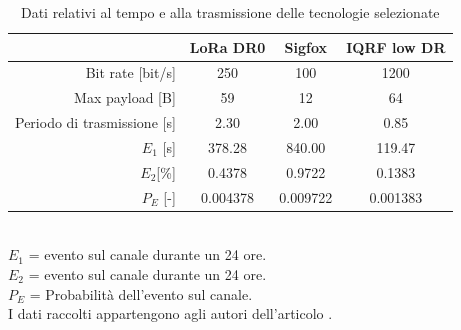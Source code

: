 \documentclass[a4paper]{report} %
\begin{document}
\begin{table}
\caption{Dati relativi al tempo e alla trasmissione delle tecnologie selezionate} 
\label{tab:confronto}
\begin{center}
\begin{tabular}{|r|c|c|c|}
&LoRa DR0&Sigfox&IQRF low DR\\ \hline
Bit rate [bit/s]&250&100&1200\\ \hline
Max payload [B]&59&12&64\\ \hline
Periodo di trasmissione [s]&2.30&2.00&0.85\\ \hline
$E_1$ [s]&378.28&840.00&119.47\\ \hline
$E_2$[\%]&0.4378&0.9722&0.1383\\ \hline
$P_E$ [-]&0.004378&0.009722&0.001383\\ \hline
\end{tabular}
\\ 
$E_1$ = evento sul canale durante un 24 ore. \\
$E_2$ = evento sul canale durante un 24 ore. \\
$P_E$ = Probabilità dell'evento sul canale. \\
I dati raccolti appartengono agli autori dell'articolo \cite{art:rif.46}. \\
\end{center}
\end{table}
\end{document}
